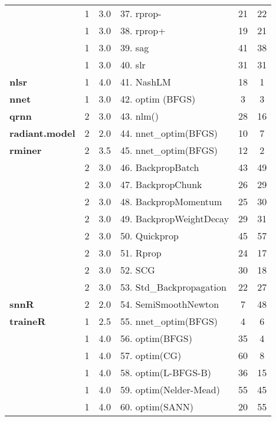 \begin{Schunk}
\begin{table}
\begin{tabular}[t]{>{\bfseries}lcclcc}
 & 1 & 3.0 & 37. rprop- & 21 & 22\\

 & 1 & 3.0 & 38. rprop+ & 19 & 21\\

 & 1 & 3.0 & 39. sag & 41 & 38\\

\multirow{-5}{*}{\raggedright\arraybackslash neuralnet} & 1 & 3.0 & 40. slr & 31 & 31\\
\cmidrule{1-6}
nlsr & 1 & 4.0 & 41. NashLM & 18 & 1\\
\cmidrule{1-6}
nnet & 1 & 3.0 & 42. optim (BFGS) & 3 & 3\\
\cmidrule{1-6}
qrnn & 2 & 3.0 & 43. nlm() & 28 & 16\\
\cmidrule{1-6}
radiant.model & 2 & 2.0 & 44. nnet\_optim(BFGS) & 10 & 7\\
\cmidrule{1-6}
rminer & 2 & 3.5 & 45. nnet\_optim(BFGS) & 12 & 2\\
\cmidrule{1-6}
 & 2 & 3.0 & 46. BackpropBatch & 43 & 49\\

 & 2 & 3.0 & 47. BackpropChunk & 26 & 29\\

 & 2 & 3.0 & 48. BackpropMomentum & 25 & 30\\

 & 2 & 3.0 & 49. BackpropWeightDecay & 29 & 31\\

 & 2 & 3.0 & 50. Quickprop & 45 & 57\\

 & 2 & 3.0 & 51. Rprop & 24 & 17\\

 & 2 & 3.0 & 52. SCG & 30 & 18\\

\multirow{-8}{*}{\raggedright\arraybackslash RSNNS} & 2 & 3.0 & 53. Std\_Backpropagation & 22 & 27\\
\cmidrule{1-6}
snnR & 2 & 2.0 & 54. SemiSmoothNewton & 7 & 48\\
\cmidrule{1-6}
traineR & 1 & 2.5 & 55. nnet\_optim(BFGS) & 4 & 6\\
\cmidrule{1-6}
 & 1 & 4.0 & 56. optim(BFGS) & 35 & 4\\

 & 1 & 4.0 & 57. optim(CG) & 60 & 8\\

 & 1 & 4.0 & 58. optim(L-BFGS-B) & 36 & 15\\

 & 1 & 4.0 & 59. optim(Nelder-Mead) & 55 & 45\\

\multirow{-5}{*}{\raggedright\arraybackslash validann} & 1 & 4.0 & 60. optim(SANN) & 20 & 55\\
\bottomrule
\end{tabular}
\end{table}

\end{Schunk}


